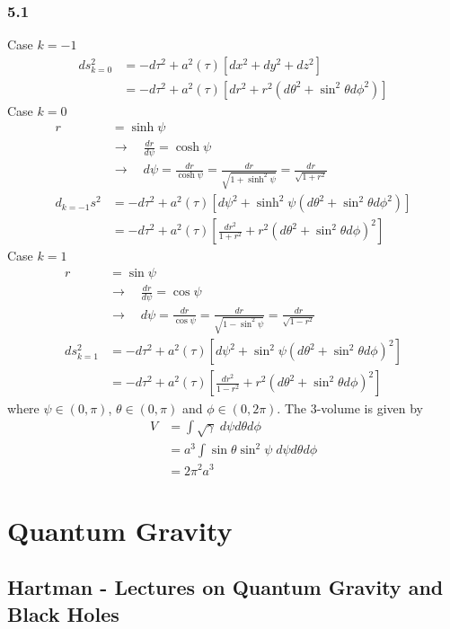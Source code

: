 \documentclass[10pt,a4paper]{article}
\theoremstyle{definition}
\begin{document}
\subsubsection{5.1}
Case $k=-1$
\begin{align}
ds_{k=0}^2&=-d\tau^2+a^2(\tau)\left[dx^2+dy^2+dz^2\right]\\
 &=-d\tau^2+a^2(\tau)\left[dr^2+r^2(d\theta^2+\sin^2\theta d\phi^2)\right]
\end{align}
Case $k=0$
\begin{align}
r&=\sinh\psi\\
&\rightarrow\quad\frac{dr}{d\psi}=\cosh\psi\\
&\rightarrow\quad d\psi=\frac{dr}{\cosh\psi}=\frac{dr}{\sqrt{1+\sinh^2\psi}}=\frac{dr}{\sqrt{1+r^2}}\\
d_{k=-1}s^2&=-d\tau^2+a^2(\tau)\left[d\psi^2+\sinh^2\psi(d\theta^2+\sin^2\theta d\phi^2)\right]\\
&=-d\tau^2+a^2(\tau)\left[\frac{dr^2}{1+r^2}+r^2(d\theta^2+\sin^2\theta d\phi)^2\right]
\end{align}
Case $k=1$
\begin{align}
r&=\sin\psi\\
&\rightarrow\quad\frac{dr}{d\psi}=\cos\psi\\
&\rightarrow\quad d\psi=\frac{dr}{\cos\psi}=\frac{dr}{\sqrt{1-\sin^2\psi}}=\frac{dr}{\sqrt{1-r^2}}\\
ds_{k=1}^2&=-d\tau^2+a^2(\tau)\left[d\psi^2+\sin^2\psi(d\theta^2+\sin^2\theta d\phi)^2\right]\\
&=-d\tau^2+a^2(\tau)\left[\frac{dr^2}{1-r^2}+r^2(d\theta^2+\sin^2\theta d\phi)^2\right]
\end{align}
where $\psi\in(0,\pi)$, $\theta\in(0,\pi)$ and $\phi\in(0,2\pi)$. The 3-volume is given by
\begin{align}
V&=\int \sqrt{\gamma}\;d\psi d\theta d\phi\\
&=a^3\int \sin\theta\sin^2\psi\; d\psi d\theta d\phi\\
&=2\pi^2 a^3
\end{align}


\newpage
\section{Quantum Gravity}
\subsection{{\sc Hartman} - Lectures on Quantum Gravity and Black Holes}
\end{document}
